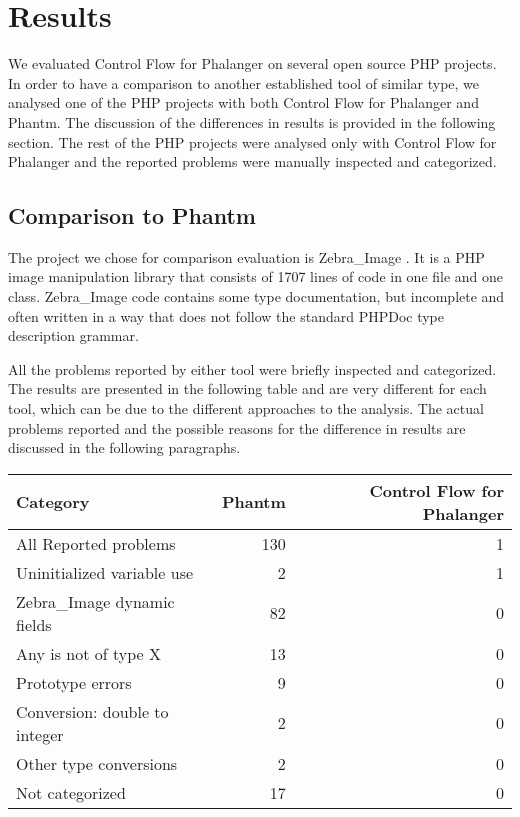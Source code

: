 \chapter{Results}
We evaluated Control Flow for Phalanger on several open source PHP projects. 
In order to have a comparison to another established tool of similar type, 
we analysed one of the PHP projects with both Control Flow for Phalanger and 
Phantm. The discussion of the differences in results is provided in the 
following section. The rest of the PHP projects were analysed only with 
Control Flow for Phalanger and the reported problems were manually inspected 
and categorized.


\section{Comparison to Phantm\label{phantmresults}}

The project we chose for comparison evaluation is Zebra\_Image \cite{zebraimage}. 
It is a PHP image manipulation library that consists of 1707 lines of code 
in one file and one class. Zebra\_Image code contains some type documentation, 
but incomplete and often written in a way that does not follow the standard 
PHPDoc type description grammar.

All the problems reported by either tool were briefly inspected and 
categorized. The results are presented in the following table and 
are very different for each tool, which can be due to the 
different approaches to the analysis. The actual problems reported and 
the possible reasons for the difference in results are discussed in 
the following paragraphs.

\begin{center}
    \begin{tabular}{| p{6cm} | r | r |}
    \hline
    \textbf{Category}           &   \textbf{Phantm}      &   \textbf{Control Flow for Phalanger} \\ \hline
    All Reported problems       &     130                &    1   \\ \hline
    Uninitialized variable use  &       2                &    1   \\ \hline
    Zebra\_Image dynamic fields  &       82               &    0     \\ \hline
    Any is not of type X        &       13               &    0     \\ \hline    
    Prototype errors            &       9                &    0     \\ \hline    
    Conversion: double to integer&       2               &    0     \\ \hline    
    Other type conversions      &       2               &    0     \\ \hline    
    Not categorized             &       17               &    0     \\ \hline    
    \end{tabular}
\end{center}


